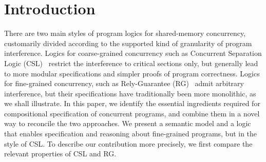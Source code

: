 \section{Introduction}
\label{sec:intro}
%
There are two main styles of program logics for shared-memory
concurrency, customarily divided according to the supported kind of
granularity of program interference. Logics for coarse-grained
concurrency such as Concurrent Separation Logic
(CSL)~\cite{OHearn07,Reynolds02} restrict the interference to critical
sections only, but generally lead to more modular specifications and
simpler proofs of program correctness. Logics for fine-grained
concurrency, such as Rely-Guarantee (RG)~\cite{jones83} admit
arbitrary interference, but their specifications have traditionally
been more monolithic, as we shall illustrate. In this paper, we identify the essential
ingredients required for compositional specification of concurrent
programs, and combine them in a novel way to reconcile the two
approaches. We present a semantic model and a logic that enables
specification and reasoning about fine-grained programs, but in the
style of CSL.
%
To describe our contribution more precisely, we first compare the
relevant properties of CSL and RG.
%
%
%
%
%
%

